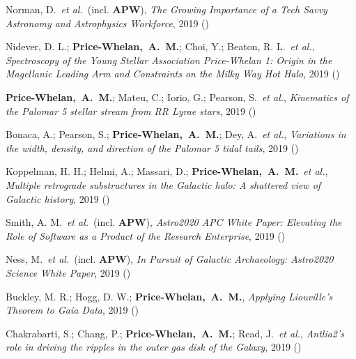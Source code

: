 \item[{\color{deemph}\scriptsize14}]Norman, D.~\textit{et al.}~(incl. \textbf{APW}), \textit{The Growing Importance of a Tech Savvy Astronomy and Astrophysics Workforce}, 2019 ()

\item[{\color{deemph}\scriptsize13}]Nidever, D. L.; \textbf{Price-Whelan,~A.~M.}; Choi, Y.; Beaton, R. L.~\textit{et al.}, \textit{Spectroscopy of the Young Stellar Association Price-Whelan 1: Origin in the Magellanic Leading Arm and Constraints on the Milky Way Hot Halo}, 2019 ()

\item[{\color{deemph}\scriptsize12}]\textbf{Price-Whelan,~A.~M.}; Mateu, C.; Iorio, G.; Pearson, S.~\textit{et al.}, \textit{Kinematics of the Palomar 5 stellar stream from RR Lyrae stars}, 2019 ()

\item[{\color{deemph}\scriptsize11}]Bonaca, A.; Pearson, S.; \textbf{Price-Whelan,~A.~M.}; Dey, A.~\textit{et al.}, \textit{Variations in the width, density, and direction of the Palomar 5 tidal tails}, 2019 ()

\item[{\color{deemph}\scriptsize10}]Koppelman, H. H.; Helmi, A.; Massari, D.; \textbf{Price-Whelan,~A.~M.}~\textit{et al.}, \textit{Multiple retrograde substructures in the Galactic halo: A shattered view of Galactic history}, 2019 ()

\item[{\color{deemph}\scriptsize9}]Smith, A. M.~\textit{et al.}~(incl. \textbf{APW}), \textit{Astro2020 APC White Paper: Elevating the Role of Software as a Product of the Research Enterprise}, 2019 ()

\item[{\color{deemph}\scriptsize8}]Ness, M.~\textit{et al.}~(incl. \textbf{APW}), \textit{In Pursuit of Galactic Archaeology: Astro2020 Science White Paper}, 2019 ()

\item[{\color{deemph}\scriptsize7}]Buckley, M. R.; Hogg, D. W.; \textbf{Price-Whelan,~A.~M.}, \textit{Applying Liouville's Theorem to Gaia Data}, 2019 ()

\item[{\color{deemph}\scriptsize6}]Chakrabarti, S.; Chang, P.; \textbf{Price-Whelan,~A.~M.}; Read, J.~\textit{et al.}, \textit{Antlia2's role in driving the ripples in the outer gas disk of the Galaxy}, 2019 ()


